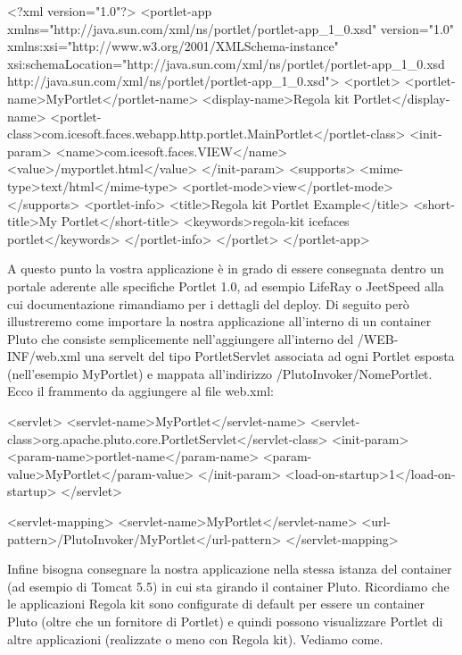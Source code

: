 \begin{xml}
<?xml version="1.0"?>
<portlet-app xmlns="http://java.sun.com/xml/ns/portlet/portlet-app_1_0.xsd" version="1.0" xmlns:xsi="http://www.w3.org/2001/XMLSchema-instance" xsi:schemaLocation="http://java.sun.com/xml/ns/portlet/portlet-app_1_0.xsd http://java.sun.com/xml/ns/portlet/portlet-app_1_0.xsd">
    <portlet>
        <portlet-name>MyPortlet</portlet-name>
        <display-name>Regola kit Portlet</display-name>
        <portlet-class>com.icesoft.faces.webapp.http.portlet.MainPortlet</portlet-class>
        <init-param>
            <name>com.icesoft.faces.VIEW</name>
            <value>/myportlet.html</value>
        </init-param>
        <supports>
            <mime-type>text/html</mime-type>
            <portlet-mode>view</portlet-mode>
        </supports>
        <portlet-info>
            <title>Regola kit Portlet Example</title>
            <short-title>My Portlet</short-title>
            <keywords>regola-kit icefaces portlet</keywords>
        </portlet-info>
    </portlet>
</portlet-app>
  
\end{xml}


A questo punto la vostra applicazione è in grado di essere consegnata dentro un portale aderente alle specifiche Portlet 1.0, ad esempio LifeRay o JeetSpeed alla cui documentazione rimandiamo per i dettagli del deploy. Di seguito però illustreremo come importare la nostra applicazione all'interno di un container Pluto che consiste semplicemente nell'aggiungere all'interno del /WEB-INF/web.xml una servelt del tipo PortletServlet associata ad ogni Portlet esposta (nell'esempio MyPortlet)  e mappata all'indirizzo  /PlutoInvoker/NomePortlet. Ecco il frammento da aggiungere al file web.xml:

\begin{xml}
<servlet>
        <servlet-name>MyPortlet</servlet-name>
        <servlet-class>org.apache.pluto.core.PortletServlet</servlet-class>
        <init-param>
            <param-name>portlet-name</param-name>
            <param-value>MyPortlet</param-value>
        </init-param>
        <load-on-startup>1</load-on-startup>
  </servlet>
  
  <servlet-mapping>
      <servlet-name>MyPortlet</servlet-name>
      <url-pattern>/PlutoInvoker/MyPortlet</url-pattern>
  </servlet-mapping>
  
\end{xml}

Infine bisogna consegnare la nostra applicazione nella stessa istanza del container (ad esempio di Tomcat 5.5) in cui sta girando il container Pluto. Ricordiamo che le applicazioni Regola kit sono configurate di default per essere un container Pluto (oltre che un fornitore di Portlet)  e quindi possono visualizzare Portlet di altre applicazioni (realizzate o meno con Regola kit). Vediamo come.

